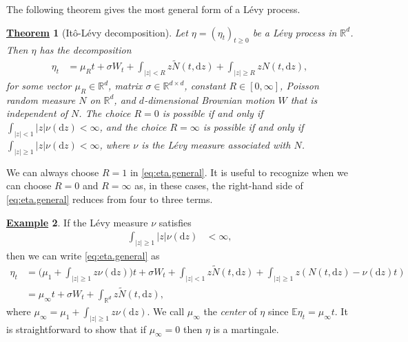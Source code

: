 \documentclass[12pt]{book}
\numberwithin{equation}{chapter}
\theoremstyle{plain}
\newtheorem{theorem}{\underline{Theorem}}
\numberwithin{theorem}{section}
\theoremstyle{definition}
\newtheorem{example}[theorem]{\underline{Example}}
\numberwithin{exercise}{chapter}
\newcommand{\<}{\langle}
\renewcommand{\>}{\rangle}
\renewcommand{\(}{\left(}
\renewcommand{\)}{\right)}
\renewcommand{\[}{\left[}
\renewcommand{\]}{\right]}
\newcommand\Eb{\mathds{E}}
\newcommand\Rb{\mathds{R}}
\newcommand\sig{\sigma}
\newcommand\Nt{\widetilde{N}}
\newcommand\dd{\mathrm{d}}
\begin{document}
\noindent
The following theorem gives the most general form of a L\'evy process.

\begin{theorem}[It\^o-L\'evy decomposition]
Let $\eta = (\eta_t)_{t \geq 0}$ be a L\'evy process in $\Rb^d$.  Then $\eta$ has the decomposition
\begin{align}
\eta_t
	&=	\mu_R t + \sig W_t + \int_{|z| < R} z \Nt( t , \dd z ) + \int_{|z| \geq R} z N( t, \dd z) , \label{eq:eta.general}
\end{align}
for some vector $\mu_R \in \Rb^d$, matrix $\sig \in \Rb^{d \times d}$, constant $R \in [0,\infty]$,
Poisson random measure $N$ on $\Rb^d$, and $d$-dimensional Brownian motion $W$ that is independent of $N$.
The choice $R = 0$ is possible if and only if $\int_{|z| < 1} |z| \nu(\dd z) < \infty$, and the choice $R = \infty$ is possible if and only if $\int_{|z| \geq 1} |z| \nu(\dd z) < \infty$, where $\nu$ is the L\'evy measure associated with $N$.
\end{theorem}

\noindent
We can always choose $R = 1$ in \eqref{eq:eta.general}.  It is useful to recognize when we can choose $R=0$ and $R=\infty$ as, in these cases, the 
right-hand side of \eqref{eq:eta.general} reduces from four to three terms.
\begin{example}
If the L\'evy measure $\nu$ satisfies
\begin{align}
\int_{|z| \geq 1}  |z| \nu( \dd z)
	&< \infty , \label{eq:large.levy}
\end{align}
then we can write \eqref{eq:eta.general} as
\begin{align}
\eta_t
	&=	\Big( \mu_1 + \int_{|z| \geq 1} z \nu(\dd z) \Big)t + \sig W_t + \int_{|z| < 1} z \Nt( t , \dd z ) + \int_{|z| \geq 1} z \( N( t, \dd z)  - \nu(\dd z) t \) \\
	&=	\mu_\infty t + \sig W_t +  \int_{\Rb^d}  z \Nt( t , \dd z ) , \label{eq:levy.compensated}
\end{align} 
where $\mu_\infty = \mu_1 + \int_{|z| \geq 1} z \nu(\dd z)$.
We call $\mu_\infty$ the \emph{center} of $\eta$ since $\Eb \eta_t = \mu_\infty t$.
It is straightforward to show that if $\mu_\infty = 0$ then $\eta$ is a martingale.
\end{example}
\end{document}
